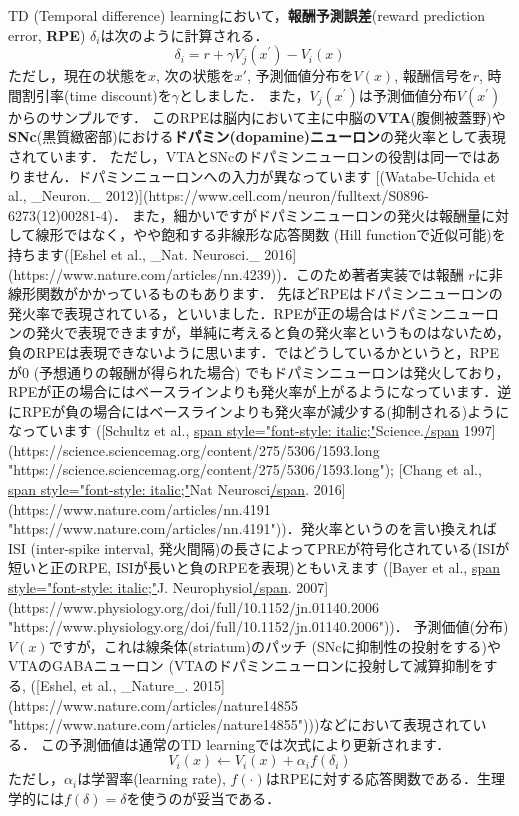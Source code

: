 TD (Temporal difference) learningにおいて，\textbf{報酬予測誤差}(reward prediction error, \textbf{RPE}) $\delta_{i}$は次のように計算される． 
$$ 
\delta_{i}=r+\gamma V_{j}\left(x^{\prime}\right)-V_{i}(x) 
$$ 
ただし，現在の状態を$x$, 次の状態を$x'$, 予測価値分布を$V(x)$, 報酬信号を$r$, 時間割引率(time discount)を$\gamma$としました．
また，$V_{j}\left(x^{\prime}\right)$は予測価値分布$V\left(x^{\prime}\right)$からのサンプルです． このRPEは脳内において主に中脳の\textbf{VTA}(腹側被蓋野)や\textbf{SNc}(黒質緻密部)における\textbf{ドパミン(dopamine)ニューロン}の発火率として表現されています．
ただし，VTAとSNcのドパミンニューロンの役割は同一ではありません．ドパミンニューロンへの入力が異なっています [(Watabe-Uchida et al., _Neuron._ 2012)](https://www.cell.com/neuron/fulltext/S0896-6273(12)00281-4)． また，細かいですがドパミンニューロンの発火は報酬量に対して線形ではなく，やや飽和する非線形な応答関数 (Hill functionで近似可能)を持ちます([Eshel et al., _Nat. Neurosci._ 2016](https://www.nature.com/articles/nn.4239))．このため著者実装では報酬 $r$に非線形関数がかかっているものもあります．
先ほどRPEはドパミンニューロンの発火率で表現されている，といいました．RPEが正の場合はドパミンニューロンの発火で表現できますが，単純に考えると負の発火率というものはないため，負のRPEは表現できないように思います．ではどうしているかというと，RPEが0 (予想通りの報酬が得られた場合) でもドパミンニューロンは発火しており，RPEが正の場合にはベースラインよりも発火率が上がるようになっています．逆にRPEが負の場合にはベースラインよりも発火率が減少する(抑制される)ようになっています
    ([Schultz et al., \url{span style="font-style: italic;"}Science.\url{/span} 1997](https://science.sciencemag.org/content/275/5306/1593.long "https://science.sciencemag.org/content/275/5306/1593.long"); [Chang et al., \url{span style="font-style: italic;"}Nat Neurosci\url{/span}. 2016](https://www.nature.com/articles/nn.4191 "https://www.nature.com/articles/nn.4191"))．発火率というのを言い換えればISI (inter-spike interval, 発火間隔)の長さによってPREが符号化されている(ISIが短いと正のRPE, ISIが長いと負のRPEを表現)ともいえます ([Bayer et al., \url{span style="font-style: italic;"}J.
    Neurophysiol\url{/span}. 2007](https://www.physiology.org/doi/full/10.1152/jn.01140.2006 "https://www.physiology.org/doi/full/10.1152/jn.01140.2006"))．
予測価値(分布) $V(x)$ですが，これは線条体(striatum)のパッチ (SNcに抑制性の投射をする)やVTAのGABAニューロン (VTAのドパミンニューロンに投射して減算抑制をする, ([Eshel, et al., _Nature_. 2015](https://www.nature.com/articles/nature14855 "https://www.nature.com/articles/nature14855")))などにおいて表現されている． この予測価値は通常のTD learningでは次式により更新されます． 
$$ 
V_{i}(x) \leftarrow V_{i}(x)+\alpha_{i} f\left(\delta_{i}\right) 
$$ 
ただし，$\alpha_{i}$は学習率(learning rate), $f(\cdot)$はRPEに対する応答関数である．生理学的には$f(\delta)=\delta$を使うのが妥当である．